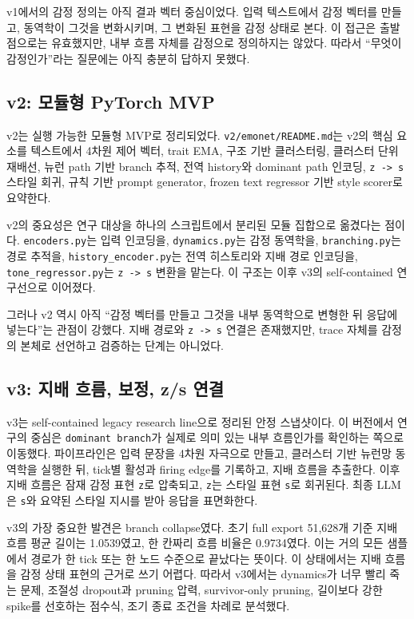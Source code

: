 \documentclass[11pt,a4paper]{article}
\newcommand{\eng}[1]{\texttt{#1}}
\begin{document}
v1에서의 감정 정의는 아직 결과 벡터 중심이었다. 입력 텍스트에서 감정 벡터를 만들고, 동역학이 그것을 변화시키며, 그 변화된 표현을 감정 상태로 본다. 이 접근은 출발점으로는 유효했지만, 내부 흐름 자체를 감정으로 정의하지는 않았다. 따라서 ``무엇이 감정인가''라는 질문에는 아직 충분히 답하지 못했다.

\subsection{v2: 모듈형 PyTorch MVP}

v2는 실행 가능한 모듈형 MVP로 정리되었다. \eng{v2/emonet/README.md}는 v2의 핵심 요소를 텍스트에서 4차원 제어 벡터, trait EMA, 구조 기반 클러스터링, 클러스터 단위 재배선, 뉴런 path 기반 branch 추적, 전역 history와 dominant path 인코딩, \eng{z -> s} 스타일 회귀, 규칙 기반 prompt generator, frozen text regressor 기반 style scorer로 요약한다.

v2의 중요성은 연구 대상을 하나의 스크립트에서 분리된 모듈 집합으로 옮겼다는 점이다. \eng{encoders.py}는 입력 인코딩을, \eng{dynamics.py}는 감정 동역학을, \eng{branching.py}는 경로 추적을, \eng{history\_encoder.py}는 전역 히스토리와 지배 경로 인코딩을, \eng{tone\_regressor.py}는 \eng{z -> s} 변환을 맡는다. 이 구조는 이후 v3의 self-contained 연구선으로 이어졌다.

그러나 v2 역시 아직 ``감정 벡터를 만들고 그것을 내부 동역학으로 변형한 뒤 응답에 넣는다''는 관점이 강했다. 지배 경로와 \eng{z -> s} 연결은 존재했지만, trace 자체를 감정의 본체로 선언하고 검증하는 단계는 아니었다.

\subsection{v3: 지배 흐름, 보정, z/s 연결}

v3는 self-contained legacy research line으로 정리된 안정 스냅샷이다. 이 버전에서 연구의 중심은 \eng{dominant branch}가 실제로 의미 있는 내부 흐름인가를 확인하는 쪽으로 이동했다. 파이프라인은 입력 문장을 4차원 자극으로 만들고, 클러스터 기반 뉴런망 동역학을 실행한 뒤, tick별 활성과 firing edge를 기록하고, 지배 흐름을 추출한다. 이후 지배 흐름은 잠재 감정 표현 \eng{z}로 압축되고, \eng{z}는 스타일 표현 \eng{s}로 회귀된다. 최종 LLM은 \eng{s}와 요약된 스타일 지시를 받아 응답을 표면화한다.

v3의 가장 중요한 발견은 branch collapse였다. 초기 full export 51,628개 기준 지배 흐름 평균 길이는 1.0539였고, 한 칸짜리 흐름 비율은 0.9734였다. 이는 거의 모든 샘플에서 경로가 한 tick 또는 한 노드 수준으로 끝났다는 뜻이다. 이 상태에서는 지배 흐름을 감정 상태 표현의 근거로 쓰기 어렵다. 따라서 v3에서는 dynamics가 너무 빨리 죽는 문제, 조절성 dropout과 pruning 압력, survivor-only pruning, 길이보다 강한 spike를 선호하는 점수식, 조기 종료 조건을 차례로 분석했다.
\end{document}
